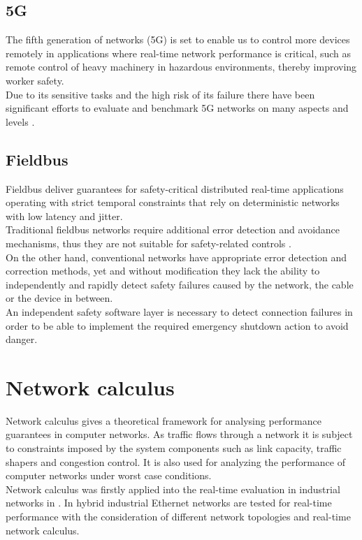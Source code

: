 \subsection{5G}
The fifth generation of networks (5G) is set to enable us to control more devices remotely in applications where real-time network
performance is critical, such as remote control of heavy machinery in hazardous environments, thereby improving worker safety.\\
Due to its sensitive tasks and the high risk of its failure there have been significant efforts to evaluate and benchmark 5G networks
on many aspects and levels \cite{8911639} \cite{8489869} \cite{7561053}.

\subsection{Fieldbus}
Fieldbus deliver guarantees for safety-critical distributed real-time applications operating with strict temporal constraints that rely on deterministic networks with low latency and jitter.\\
Traditional fieldbus networks require additional error detection and avoidance mechanisms, thus they are not suitable for safety-related controls \cite{1159702}.\\
On the other hand, conventional networks have appropriate error detection and correction methods, yet and without modification they lack the ability to independently and rapidly detect safety failures caused by the network, the cable or the device in between.\\
An independent safety software layer is necessary to detect connection failures in order to be able to implement the required emergency shutdown action to avoid danger\cite{fieldbus2005}.

\section{Network calculus}
Network calculus gives a theoretical framework for analysing performance guarantees in computer networks.
As traffic flows through a network it is subject to constraints imposed by the system components such as link capacity, traffic shapers and congestion control.
It is also used for analyzing the performance of computer networks under worst case conditions.\\
Network calculus was firstly applied into the real-time evaluation in industrial networks in \cite{WATSON2003251} \cite{1020794}.
In \cite{5554500} hybrid industrial Ethernet networks are tested for real-time performance with the consideration of different network topologies and real-time network calculus.\\

